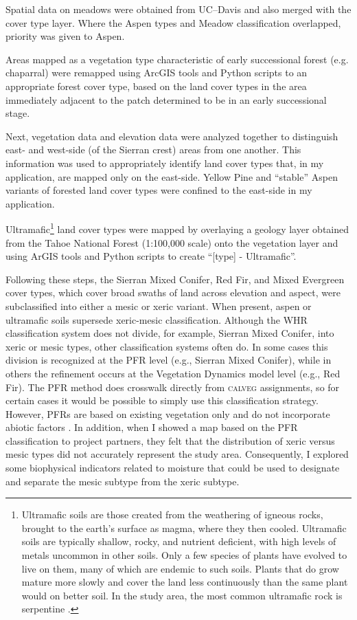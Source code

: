 Spatial data on meadows were obtained from UC--Davis \cite{Fryjoff-Hung2012} and also merged with the cover type layer. Where the Aspen types and Meadow classification overlapped, priority was given to Aspen.

Areas mapped as a vegetation type characteristic of early successional forest (e.g. chaparral) were remapped using ArcGIS tools and Python scripts to an appropriate forest cover type, based on the land cover types in the area immediately adjacent to the patch determined to be in an early successional stage. 

Next, vegetation data and elevation data were analyzed together to distinguish east- and west-side (of the Sierran crest) areas from one another. This information was used to appropriately identify land cover types that, in my application, are mapped only on the east-side. Yellow Pine and ``stable'' Aspen variants of forested land cover types were confined to the east-side in my application. 

Ultramafic\footnote{Ultramafic soils are those created from the weathering of igneous rocks, brought to the earth's surface as magma, where they then cooled. Ultramafic soils are typically shallow, rocky, and nutrient deficient, with high levels of metals uncommon in other soils. Only a few species of plants have evolved to live on them, many of which are endemic to such soils. Plants that do grow mature more slowly and cover the land less continuously than the same plant would on better soil. In the study area, the most common ultramafic rock is serpentine \citep{Safford2004}.} land cover types were mapped by overlaying a geology layer obtained from the Tahoe National Forest (1:100,000 scale) onto the vegetation layer and using ArGIS tools and Python scripts to create ``[type] - Ultramafic''. 

Following these steps, the Sierran Mixed Conifer, Red Fir, and Mixed Evergreen cover types, which cover broad swaths of land across elevation and aspect, were subclassified into either a mesic or xeric variant. When present, aspen or ultramafic soils supersede xeric-mesic classification. Although the WHR classification system does not divide, for example, Sierran Mixed Conifer, into xeric or mesic types, other classification systems often do. In some cases this division is recognized at the PFR level (e.g., Sierran Mixed Conifer), while in others the refinement occurs at the Vegetation Dynamics model level (e.g., Red Fir). The PFR method does crosswalk directly from \textsc{calveg} assignments, so for certain cases it would be possible to simply use this classification strategy. However, PFRs are based on existing vegetation only and do not incorporate abiotic factors \citep{Safford2014}. In addition, when I showed a map based on the PFR classification to project partners, they felt that the distribution of xeric versus mesic types did not accurately represent the study area. Consequently, I explored some biophysical indicators related to moisture that could be used to designate and separate the mesic subtype from the xeric subtype.

